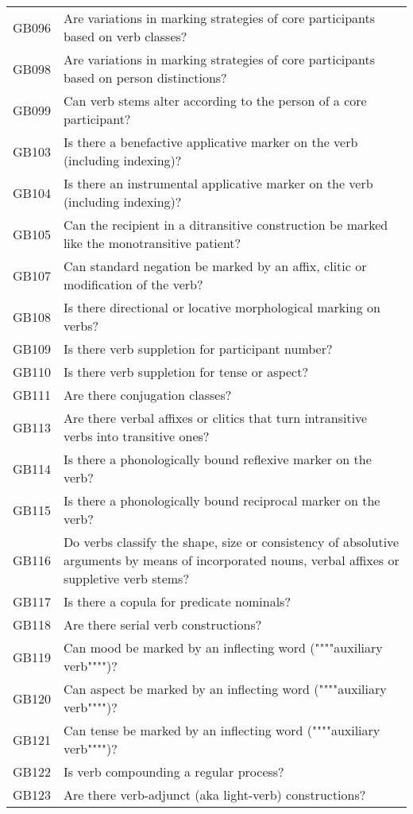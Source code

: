 \begin{longtable}{p{3cm}p{12cm}}
  GB096 & Are variations in marking strategies of core participants based on verb classes? \\ 
  GB098 & Are variations in marking strategies of core participants based on person distinctions? \\ 
  GB099 & Can verb stems alter according to the person of a core participant? \\ 
  GB103 & Is there a benefactive applicative marker on the verb (including indexing)? \\ 
  GB104 & Is there an instrumental applicative marker on the verb (including indexing)? \\ 
  GB105 & Can the recipient in a ditransitive construction be marked like the monotransitive patient? \\ 
  GB107 & Can standard negation be marked by an affix, clitic or modification of the verb? \\ 
  GB108 & Is there directional or locative morphological marking on verbs? \\ 
  GB109 & Is there verb suppletion for participant number? \\ 
  GB110 & Is there verb suppletion for tense or aspect? \\ 
  GB111 & Are there conjugation classes? \\ 
  GB113 & Are there verbal affixes or clitics that turn intransitive verbs into transitive ones? \\ 
  GB114 & Is there a phonologically bound reflexive marker on the verb? \\ 
  GB115 & Is there a phonologically bound reciprocal marker on the verb? \\ 
  GB116 & Do verbs classify the shape, size or consistency of absolutive arguments by means of incorporated nouns, verbal affixes or suppletive verb stems? \\ 
  GB117 & Is there a copula for predicate nominals? \\ 
  GB118 & Are there serial verb constructions? \\ 
  GB119 & Can mood be marked by an inflecting word (""""auxiliary verb"""")? \\ 
  GB120 & Can aspect be marked by an inflecting word (""""auxiliary verb"""")? \\ 
  GB121 & Can tense be marked by an inflecting word (""""auxiliary verb"""")? \\ 
  GB122 & Is verb compounding a regular process? \\ 
  GB123 & Are there verb-adjunct (aka light-verb) constructions? \\ 

\end{longtable}
